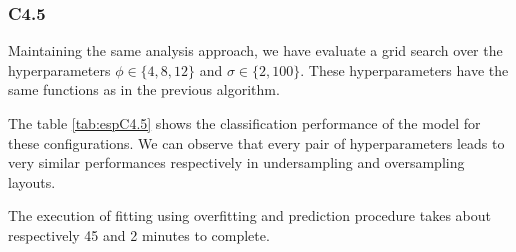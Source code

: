 \documentclass[12pt]{article}
\begin{document}
\begin{table}[H]

    
\end{table}


\subsubsection{C4.5}

Maintaining the same analysis approach, we have evaluate a grid search over the hyperparameters $\phi \in \{4,8,12\}$ and $\sigma \in \{2, 100\}$. These hyperparameters have the same functions as in the previous algorithm.

The table \ref{tab:espC4.5} shows the classification performance of the model for these configurations.
We can observe that every pair of hyperparameters leads to very similar performances respectively in undersampling and oversampling layouts.

The execution of fitting using overfitting and prediction procedure takes about respectively 45 and 2 minutes to complete.
\end{document}
